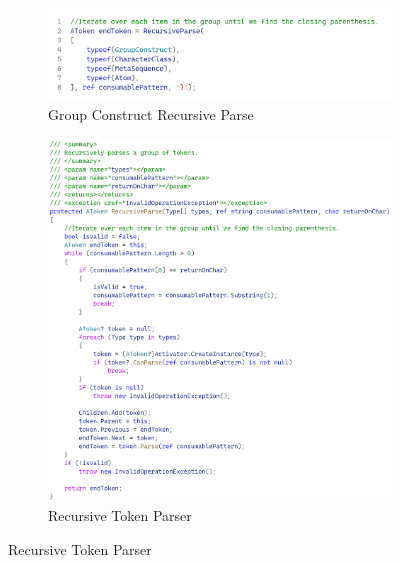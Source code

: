 \begin{figure}
    \caption{Regex Token Recursive Parse}
    \label{fig:RegexTokenRecursiveParse}
    \centering
    \begin{subfigure}[b]{0.5\textwidth}
        \caption{Group Construct Recursive Parse}
        \label{fig:GroupConstructRecursiveParse}
        \includegraphics[width=\linewidth, height=0.3\textheight, keepaspectratio]{Figures/GroupConstructRecursiveParse.png}
    \end{subfigure}
    \begin{subfigure}[b]{0.5\textwidth}
        \caption{Recursive Token Parser}
        \label{fig:AToken_RecursiveParse}
        \includegraphics[width=\linewidth, height=\textheight, keepaspectratio]{Figures/AToken_RecursiveParse.png}
    \end{subfigure}
\end{figure}

